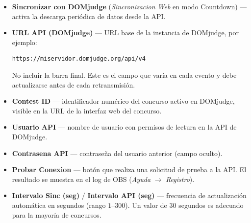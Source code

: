 \begin{itemize}
  \item \textbf{Sincronizar con DOMjudge} (\textit{Sincronizacion Web} en modo Countdown) — activa la descarga periódica de datos desde la API.
  \item \textbf{URL API (DOMjudge)} — URL base de la instancia de DOMjudge, por ejemplo:
\begin{verbatim}
https://miservidor.domjudge.org/api/v4
\end{verbatim}
    No incluir la barra final. Este es el campo que varía en cada evento y debe actualizarse antes de cada retransmisión.
  \item \textbf{Contest ID} — identificador numérico del concurso activo en DOMjudge, visible en la URL de la interfaz web del concurso.
  \item \textbf{Usuario API} — nombre de usuario con permisos de lectura en la API de DOMjudge.
  \item \textbf{Contrasena API} — contraseña del usuario anterior (campo oculto).
  \item \textbf{Probar Conexion} — botón que realiza una solicitud de prueba a la API. El resultado se muestra en el log de OBS (\textit{Ayuda} $\rightarrow$ \textit{Registro}).
  \item \textbf{Intervalo Sinc (seg)} / \textbf{Intervalo API (seg)} — frecuencia de actualización automática en segundos (rango $1$--$300$). Un valor de $30$ segundos es adecuado para la mayoría de concursos.
\end{itemize}
